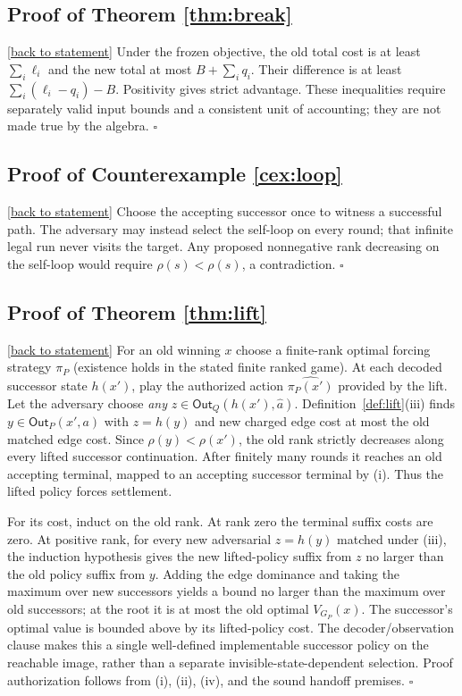 \documentclass[11pt,letterpaper]{article}
\theoremstyle{definition}
\theoremstyle{remark}
\newcommand{\Out}{\mathsf{Out}}
\newcommand{\backlink}[1]{\hyperlink{claim:#1}{\footnotesize[back to statement]}}
\begin{document}
\hypertarget{proof:break}{}\subsection*{Proof of Theorem \ref{thm:break}}\backlink{break}
Under the frozen objective, the old total cost is at least $\sum_i\ell_i$ and the new total at most $B+\sum_iq_i$. Their difference is at least $\sum_i(\ell_i-q_i)-B$. Positivity gives strict advantage. These inequalities require separately valid input bounds and a consistent unit of accounting; they are not made true by the algebra. $\square$

\hypertarget{proof:loop}{}\subsection*{Proof of Counterexample \ref{cex:loop}}\backlink{loop}
Choose the accepting successor once to witness a successful path. The adversary may instead select the self-loop on every round; that infinite legal run never visits the target. Any proposed nonnegative rank decreasing on the self-loop would require $\rho(s)<\rho(s)$, a contradiction. $\square$

\hypertarget{proof:lift}{}\subsection*{Proof of Theorem \ref{thm:lift}}\backlink{lift}
For an old winning $x$ choose a finite-rank optimal forcing strategy $\pi_P$ (existence holds in the stated finite ranked game). At each decoded successor state $h(x')$, play the authorized action $\widehat{\pi_P(x')}$ provided by the lift. Let the adversary choose \emph{any} $z\in\Out_Q(h(x'),\widehat a)$. Definition~\ref{def:lift}(iii) finds $y\in\Out_P(x',a)$ with $z=h(y)$ and new charged edge cost at most the old matched edge cost. Since $\rho(y)<\rho(x')$, the old rank strictly decreases along every lifted successor continuation. After finitely many rounds it reaches an old accepting terminal, mapped to an accepting successor terminal by (i). Thus the lifted policy forces settlement.

For its cost, induct on the old rank. At rank zero the terminal suffix costs are zero. At positive rank, for every new adversarial $z=h(y)$ matched under (iii), the induction hypothesis gives the new lifted-policy suffix from $z$ no larger than the old policy suffix from $y$. Adding the edge dominance and taking the maximum over new successors yields a bound no larger than the maximum over old successors; at the root it is at most the old optimal $V_{G_P}(x)$. The successor's optimal value is bounded above by its lifted-policy cost. The decoder/observation clause makes this a single well-defined implementable successor policy on the reachable image, rather than a separate invisible-state-dependent selection. Proof authorization follows from (i), (ii), (iv), and the sound handoff premises. $\square$
\end{document}
